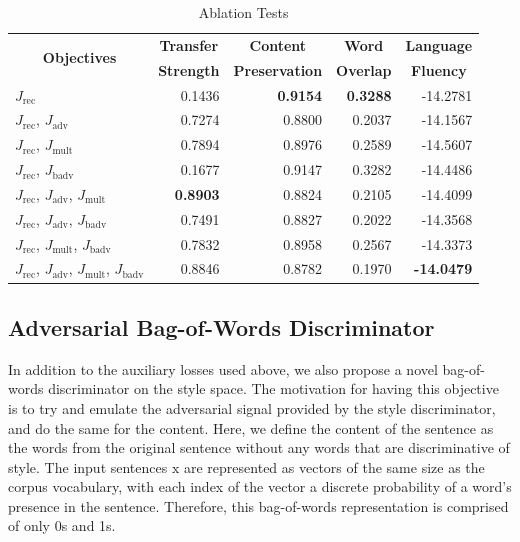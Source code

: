 \documentclass[11pt,a4paper]{article}
\newcommand{\rmx}{\mathrm x}
\newcommand{\tabh}[1]{\multicolumn{1}{c|}{\textbf{#1}}}
\newcommand{\tabc}[2]{\multicolumn{1}{|c|}{\multirow{#1}{*}{\textbf{#2}}}}
\newcommand{\loss}[1]{J_\text{#1}}
\begin{document}
\begin{table}[ht]
	\centering
	\begin{tabular}{| l | r | r | r | r |}
		\hline
		\tabc{2}{Objectives}                                     & \tabh{Transfer} & \tabh{Content}      & \tabh{Word}     & \tabh{Language}   \\
		                                                         & \tabh{Strength} & \tabh{Preservation} & \tabh{Overlap}  & \tabh{Fluency}    \\
		\hline
		\hline
		$\loss{rec}$                                             & 0.1436          & \textbf{0.9154}     & \textbf{0.3288} & -14.2781          \\
		\hline
		$\loss{rec}$, $\loss{adv}$                               & 0.7274          & 0.8800              & 0.2037          & -14.1567          \\
		\hline
		$\loss{rec}$, $\loss{mult}$                              & 0.7894          & 0.8976              & 0.2589          & -14.5607          \\
		\hline
		$\loss{rec}$, $\loss{badv}$                              & 0.1677          & 0.9147              & 0.3282          & -14.4486          \\
		\hline
		$\loss{rec}$, $\loss{adv}$, $\loss{mult}$                & \textbf{0.8903} & 0.8824              & 0.2105          & -14.4099          \\
		\hline
		$\loss{rec}$, $\loss{adv}$, $\loss{badv}$                & 0.7491          & 0.8827              & 0.2022          & -14.3568          \\
		\hline
		$\loss{rec}$, $\loss{mult}$, $\loss{badv}$               & 0.7832          & 0.8958              & 0.2567          & -14.3373          \\
		\hline
		$\loss{rec}$, $\loss{adv}$, $\loss{mult}$, $\loss{badv}$ & 0.8846          & 0.8782              & 0.1970          & \textbf{-14.0479} \\
		\hline
	\end{tabular}
	\caption{Ablation Tests}
	\label{tab:ablation-results}
\end{table}

\subsection{Adversarial Bag-of-Words Discriminator} \label{ssec:adversarial-bow-objective}

In addition to the auxiliary losses used above, we also propose a novel bag-of-words discriminator on the style space. The motivation for having this objective is to try and emulate the adversarial signal provided by the style discriminator, and do the same for the content. Here, we define the content of the sentence as the words from the original sentence without any words that are discriminative of style. The input sentences $\rmx$ are represented as vectors of the same size as the corpus vocabulary, with each index of the vector a discrete probability of a word's presence in the sentence. Therefore, this bag-of-words representation is comprised of only 0s and 1s.
\end{document}
